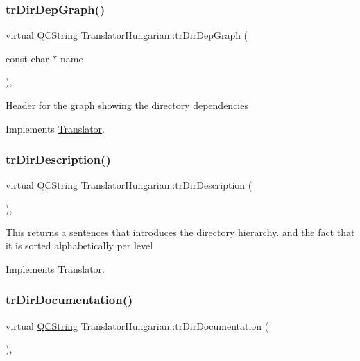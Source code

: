 \subsubsection{\texorpdfstring{trDirDepGraph()}{trDirDepGraph()}}
{\footnotesize\ttfamily virtual \mbox{\hyperlink{class_q_c_string}{Q\+C\+String}} Translator\+Hungarian\+::tr\+Dir\+Dep\+Graph (\begin{DoxyParamCaption}\item[{const char $\ast$}]{name }\end{DoxyParamCaption})\hspace{0.3cm}{\ttfamily [inline]}, {\ttfamily [virtual]}}

Header for the graph showing the directory dependencies 

Implements \mbox{\hyperlink{class_translator}{Translator}}.

\mbox{\label{class_translator_hungarian_a08342b2709d835860ee7b616621223fc}} 
\subsubsection{\texorpdfstring{trDirDescription()}{trDirDescription()}}
{\footnotesize\ttfamily virtual \mbox{\hyperlink{class_q_c_string}{Q\+C\+String}} Translator\+Hungarian\+::tr\+Dir\+Description (\begin{DoxyParamCaption}{ }\end{DoxyParamCaption})\hspace{0.3cm}{\ttfamily [inline]}, {\ttfamily [virtual]}}

This returns a sentences that introduces the directory hierarchy. and the fact that it is sorted alphabetically per level 

Implements \mbox{\hyperlink{class_translator}{Translator}}.

\mbox{\label{class_translator_hungarian_a625ababc758191f63da47ea9dbef3315}} 
\subsubsection{\texorpdfstring{trDirDocumentation()}{trDirDocumentation()}}
{\footnotesize\ttfamily virtual \mbox{\hyperlink{class_q_c_string}{Q\+C\+String}} Translator\+Hungarian\+::tr\+Dir\+Documentation (\begin{DoxyParamCaption}{ }\end{DoxyParamCaption})\hspace{0.3cm}{\ttfamily [inline]}, {\ttfamily [virtual]}}

